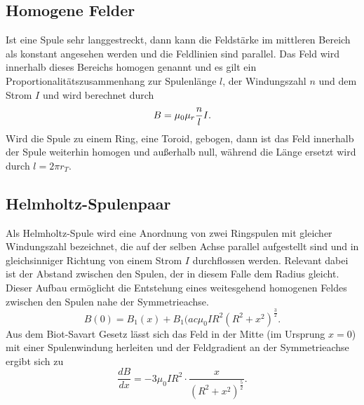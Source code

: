\documentclass[11pt]{article}
\begin{document}
\subsection{Homogene Felder}
Ist eine Spule sehr langgestreckt, dann kann die Feldstärke im mittleren Bereich als konstant angesehen werden und die
Feldlinien sind parallel.
Das Feld wird innerhalb dieses Bereichs homogen genannt und es gilt ein Proportionalitätszusammenhang zur Spulenlänge $l$,
der Windungszahl $n$ und dem Strom $I$ und wird berechnet durch
\begin{equation}
    B = \mu_{0}\mu_{r}\frac{n}{l}I .\notag
     \end{equation}
Wird die Spule zu einem Ring, eine Toroid, gebogen, dann ist das Feld innerhalb der Spule weiterhin homogen und außerhalb
null, während die Länge ersetzt wird durch $l = 2\pi r_{T}$.
\subsection{Helmholtz-Spulenpaar}
Als Helmholtz-Spule wird eine Anordnung von zwei Ringspulen mit gleicher Windungszahl bezeichnet, die auf der selben
Achse parallel aufgestellt sind und in gleichsinniger Richtung von einem Strom $I$ durchflossen werden.
Relevant dabei ist der Abstand zwischen den Spulen, der in diesem Falle dem Radius gleicht.
Dieser Aufbau ermöglicht die Entstehung eines weitesgehend homogenen Feldes zwischen den Spulen nahe der Symmetrieachse.
\begin{equation}
    B(0) = B_{1}(x) + B_{1}(ac{\mu_{0}IR^2}{(R^2+x^2)^{\frac{3}{2}}}.
    \end{equation}
Aus dem Biot-Savart Gesetz lässt sich das Feld in der Mitte (im Ursprung $x=0$) mit einer Spulenwindung herleiten und
der Feldgradient an der Symmetrieachse ergibt sich zu
\begin{equation}
    \frac{dB}{dx} = -3\mu_{0}IR^2 \cdot \frac{x}{(R^2+x^2)^{\frac{5}{2}}} .
    \end{equation}
\end{document}
